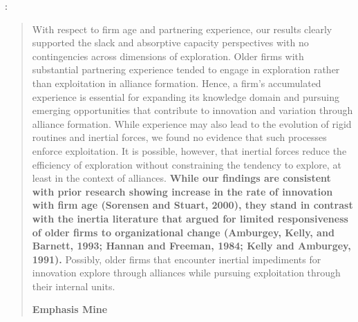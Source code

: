 \cite[p.B6]{lavie2006balancing}:
\begin{quote}
With respect to firm age and partnering experience, our results clearly supported the slack and absorptive capacity perspectives with no contingencies across dimensions of exploration.  Older firms with substantial partnering experience tended to engage in exploration rather than exploitation in alliance formation. Hence, a firm’s accumulated experience is essential for expanding its knowledge domain and pursuing emerging opportunities that contribute to innovation and variation through alliance formation. While experience may also lead to the evolution of rigid routines and inertial forces, we found no evidence that such processes enforce exploitation. It is possible, however, that inertial forces reduce the efficiency of exploration without constraining the tendency to explore, at least in the context of alliances. \textbf{While our findings are consistent with prior research showing increase in the rate of innovation with firm age (Sorensen and Stuart, 2000), they stand in contrast with the inertia literature that argued for limited responsiveness of older firms to organizational change (Amburgey, Kelly, and Barnett, 1993; Hannan and Freeman, 1984; Kelly and Amburgey, 1991).} Possibly, older firms that encounter inertial impediments for innovation explore through alliances while pursuing exploitation through their internal units.
\begin{flushright}
\textbf{Emphasis Mine}
\end{flushright}
\end{quote}

